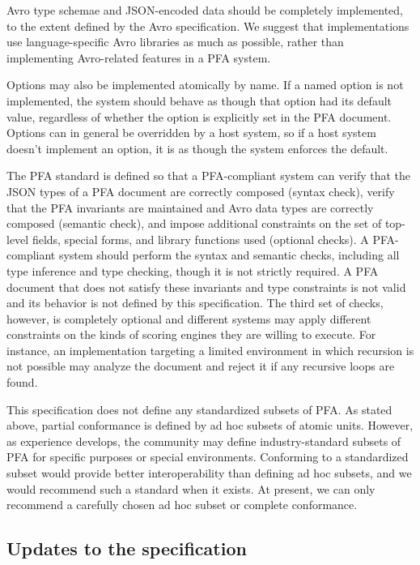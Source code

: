 \documentclass{article}
\theoremstyle{definition}
\begin{document}
Avro type schemae and JSON-encoded data should be completely implemented, to the extent defined by the Avro specification.  We suggest that implementations use language-specific Avro libraries as much as possible, rather than implementing Avro-related features in a PFA system.

Options may also be implemented atomically by name.  If a named option is not implemented, the system should behave as though that option had its default value, regardless of whether the option is explicitly set in the PFA document.  Options can in general be overridden by a host system, so if a host system doesn't implement an option, it is as though the system enforces the default.

The PFA standard is defined so that a PFA-compliant system can verify that the JSON types of a PFA document are correctly composed (syntax check), verify that the PFA invariants are maintained and Avro data types are correctly composed (semantic check), and impose additional constraints on the set of top-level fields, special forms, and library functions used (optional checks).  A PFA-compliant system should perform the syntax and semantic checks, including all type inference and type checking, though it is not strictly required.  A PFA document that does not satisfy these invariants and type constraints is not valid and its behavior is not defined by this specification.  The third set of checks, however, is completely optional and different systems may apply different constraints on the kinds of scoring engines they are willing to execute.  For instance, an implementation targeting a limited environment in which recursion is not possible may analyze the document and reject it if any recursive loops are found.

This specification does not define any standardized subsets of PFA.  As stated above, partial conformance is defined by ad hoc subsets of atomic units.  However, as experience develops, the community may define industry-standard subsets of PFA for specific purposes or special environments.  Conforming to a standardized subset would provide better interoperability than defining ad hoc subsets, and we would recommend such a standard when it exists.  At present, we can only recommend a carefully chosen ad hoc subset or complete conformance.

\subsection{Updates to the specification}
\end{document}
